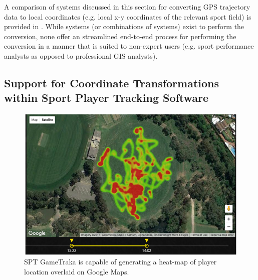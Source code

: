 A comparison of systems discussed in this section for converting GPS trajectory data to local coordinates (e.g. local x-y coordinates of the relevant sport field) is provided in . While systems (or combinations of systems) exist to perform the conversion, none offer an streamlined end-to-end process for performing the conversion in a manner that is suited to non-expert users (e.g. sport performance analysts as opposed to professional GIS analysts).

\subsection{Support for Coordinate Transformations within Sport Player Tracking Software}

\begin{figure}[htbp]
\centering
\includegraphics[width=0.8\linewidth]{figs/spatial/spt-gametraka.png}
\caption[SPT GameTraka]{SPT GameTraka\protect\footnotemark{} is capable of generating a heat-map of player location overlaid on Google Maps.
\label{fig:spt-gametraka}}
\end{figure}


